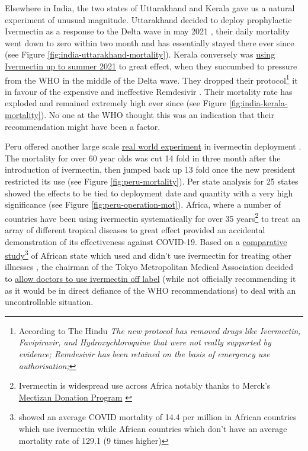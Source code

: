\documentclass[11pt,a4paper,notitlepage]{report}
\begin{document}
Elsewhere in India, the two states of Uttarakhand and Kerala gave us a natural experiment of unusual magnitude. Uttarakhand decided to deploy prophylactic Ivermectin as a response to the Delta wave in may 2021 \cite{economictimes12052021}, their daily mortality went down to zero within two month and has essentially stayed there ever since (see Figure \ref{fig:india-uttarakhand-mortality}). Kerala conversely was \href{https://dhs.kerala.gov.in/wp-content/uploads/2021/04/Kerala-State-COVID-19-guidelines-Version-3.pdf}{using Ivermectin up to summer 2021} to great effect, when they succumbed to pressure from the WHO in the middle of the Delta wave. They dropped their protocol\footnote{According to The Hindu \cite{hindu06082021} \textit{The new protocol has removed drugs like Ivermectin, Favipiravir, and Hydroxychloroquine that were not really supported by evidence; Remdesivir has been retained on the basis of emergency use authorisation;}} it in favour of the expensive and ineffective Remdesivir \cite{hindu06082021}. Their mortality rate has exploded and remained extremely high ever since (see Figure \ref{fig:india-kerala-mortality}). No one at the WHO thought this was an indication that their recommendation might have been a factor.   

Peru offered another large scale \href{ https://osf.io/9egh4/}{real world experiment} in ivermectin deployment \cite{Chamie2021}. The mortality for over 60 year olds was cut 14 fold in three month after the introduction of ivermectin, then jumped back up 13 fold once the new president restricted its use (see Figure \ref{fig:peru-mortality}). Per state analysis for 25 states showed the effects to be tied to deployment date and quantity with a very high significance (see Figure \ref{fig:peru-operation-mot}). Africa, where a number of countries have been using ivermectin systematically for over 35 years\footnote{Ivermectin is widespread use across Africa notably thanks to Merck's \href{https://www.merck.com/stories/mectizan/}{Mectizan Donation Program} \cite{merck06012021}} to treat an array of different tropical diseases to great effect provided an accidental demonstration of its effectiveness against COVID-19. Based on a \href{https://www.medrxiv.org/content/early/2021/03/26/2021.03.26.21254377.full.pdf}{comparative study}\footnote{\citet{Tanioka2021.03.26.21254377} showed an average COVID mortality of 14.4 per million in African countries which use ivermectin while African countries which don't have an average mortality rate of 129.1 (9 times higher)} of African state which used and didn’t use ivermectin for treating other illnesses \cite{Tanioka2021.03.26.21254377}, the chairman of the Tokyo Metropolitan Medical Association decided to \href{https://www.tokyo-np.co.jp/article/123988}{allow doctors to use ivermectin off label} \cite{tokyoweb13082021} (while not officially recommending it as it would be in direct defiance of the WHO recommendations) to deal with an uncontrollable situation.
\end{document}
